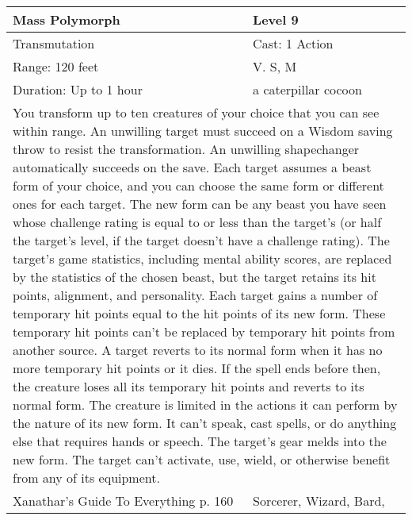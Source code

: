 \documentclass[11pt]{report}
\begin{document}
\begin{table}[H]
	\begin{tabular}{||p{6cm}|p{6cm}||}
		\hline\hline
		\bf{Mass Polymorph} & Level 9\\ \hline
		Transmutation & Cast: 1 Action\\ \hline
		Range: 120 feet & V. S, M\\ \hline
		Duration: Up to 1 hour & a caterpillar cocoon\\ \hline
		\multicolumn{2}{||p{12cm}||}{You transform up to ten creatures of your choice that you can see within range. An unwilling target must succeed on a Wisdom saving throw to resist the transformation. An unwilling shapechanger automatically succeeds on the save.
Each target assumes a beast form of your choice, and you can choose the same form or different ones for each target. The new form can be any beast you have seen whose challenge rating is equal to or less than the target’s (or half the target’s level, if the target doesn’t have a challenge rating). The target’s game statistics, including mental ability scores, are replaced by the statistics of the chosen beast, but the target retains its hit points, alignment, and personality.
Each target gains a number of temporary hit points equal to the hit points of its new form. These temporary hit points can’t be replaced by temporary hit points from another source. A target reverts to its normal form when it has no more temporary hit points or it dies. If the spell ends before then, the creature loses all its temporary hit points and reverts to its normal form.
The creature is limited in the actions it can perform by the nature of its new form. It can’t speak, cast spells, or do anything else that requires hands or speech. The target’s gear melds into the new form.
The target can’t activate, use, wield, or otherwise benefit from any of its equipment.}\\ \hline
Xanathar's Guide To Everything p. 160 & Sorcerer, Wizard, Bard, \\ \hline\hline
	\end{tabular}
\end{table}
\end{document}
